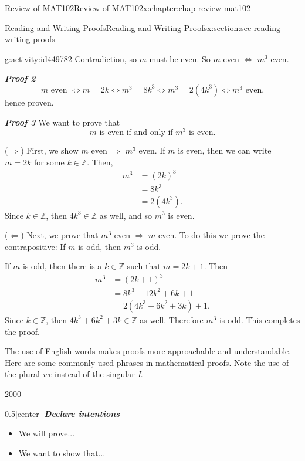 \documentclass[oneside,10pt,]{book}
\newcommand{\alert}[1]{\textbf{\textit{#1}}}
\numberwithin{equation}{section}
\newcommand{\amp}{&}
\begin{document}
\begin{chapterptx}{Review of MAT102}{}{Review of MAT102}{}{}{x:chapter:chap-review-mat102}
\begin{sectionptx}{Reading and Writing Proofs}{}{Reading and Writing Proofs}{}{}{x:section:sec-reading-writing-proofs}
\begin{activity}{}{g:activity:id449782}
Contradiction, so \(m\) must be even. So \(m\) even \(\Leftrightarrow\) \(m^3\) even.%
\par
\alert{Proof 2}%
\begin{equation*}
m \text{ even } \Leftrightarrow m = 2k \Leftrightarrow m^3 = 8k^3 \Leftrightarrow  m^3 = 2(4k^3) \Leftrightarrow  m^3 \text{ even}\text{,}
\end{equation*}
hence proven.%
\par
\alert{Proof 3} We want to prove that%
\begin{equation*}
m \text{ is even if and only if } m^3 \text{ is even}\text{.}
\end{equation*}
%
\par
(\(\Rightarrow\)) First, we show \(m\) even \(\Rightarrow\) \(m^3\) even. If \(m\) is even, then we can write \(m = 2k\) for some \(k \in \mathbb{Z}\). Then,%
\begin{align*}
m^3 \amp = (2k)^3\\
\amp = 8k^3\\
\amp = 2(4k^3)\text{.}
\end{align*}
Since \(k \in \mathbb{Z}\), then \(4k^3 \in \mathbb{Z}\) as well, and so \(m^3\) is even.%
\par
(\(\Leftarrow\)) Next, we prove that \(m^3\) even \(\Rightarrow\) \(m\) even. To do this we prove the contrapositive: If \(m\) is odd, then \(m^3\) is odd.%
\par
If \(m\) is odd, then there is a \(k \in \mathbb{Z}\) such that \(m = 2k + 1\). Then%
\begin{align*}
m^3 \amp = (2k+1)^3\\
\amp = 8k^3 + 12k^2 + 6k + 1\\
\amp = 2(4k^3 + 6k^2 + 3k) + 1\text{.}
\end{align*}
Since \(k \in \mathbb{Z}\), then \(4k^3 + 6k^2 + 3k \in \mathbb{Z}\) as well. Therefore \(m^3\) is odd. This completes the proof.%
\end{activity}
The use of English words makes proofs more approachable and understandable. Here are some commonly-used phrases in mathematical proofs. Note the use of the plural \emph{we} instead of the singular \emph{I}.%
\begin{sidebyside}{2}{0}{0}{0}%
\begin{sbspanel}{0.5}[center]%
\alert{Declare intentions}%
\begin{itemize}[label=\textbullet]
\item{}We will prove...%
\item{}We want to show that...%

\end{itemize}
\end{sbspanel}
\end{sidebyside}
\end{sectionptx}
\end{chapterptx}
\end{document}
